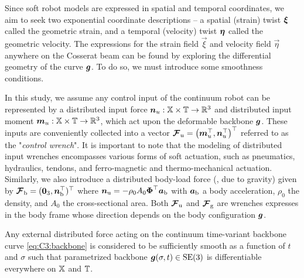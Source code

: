 Since soft robot models are expressed in spatial and temporal coordinates, we aim to seek two exponential coordinate descriptions -- a spatial (strain) twist ${\boldsymbol{\xi}}$ called the geometric strain, and a temporal (velocity) twist ${\boldsymbol{\eta}}$ called the geometric velocity. The expressions for the strain field $\vec{\xi}$ and velocity field $\vec{\eta}$ anywhere on the Cosserat beam can be found by exploring the differential geometry of the curve ${\boldsymbol{g}}$. To do so, we must introduce some smoothness conditions.

\begin{asm}
\label{assum:0}
In this study, we assume any control input of the continuum robot can be represented by a distributed input force ${\boldsymbol{n}}_u: \mathbb{X} \times \mathbb{T} \to \mathbb{R}^3$ and distributed input moment ${\boldsymbol{m}}_u: \mathbb{X} \times \mathbb{T} \to \mathbb{R}^3$, which act upon the deformable backbone ${\boldsymbol{g}}$. These inputs are conveniently collected into a vector ${\boldsymbol{\mathcal{F}}}_u = \left({\boldsymbol{m}}_u^\top, {\boldsymbol{n}}_u^\top \right)^\top$ referred to as the "\textit{control wrench}". It is important to note that the modeling of distributed input wrenches encompasses various forms of soft actuation, such as pneumatics, hydraulics, tendons, and ferro-magnetic and thermo-mechanical actuation. Similarly, we also introduce a distributed body-load force (\eg, due to gravity) given by ${\boldsymbol{\mathcal{F}}}_\textrm{b} = (\boldsymbol{0}_3, {\boldsymbol{n}}_\textrm{b}^\top)^\top$ where ${\boldsymbol{n}}_\textrm{u} = -\rho_0 A_0 {\boldsymbol{\Phi}}^\top {\boldsymbol{a}}_\textrm{b}$ with ${\boldsymbol{a}}_\textrm{b}$ a body acceleration, $\rho_0$ the density, and $A_0$ the cross-sectional area. Both ${\boldsymbol{\mathcal{F}}}_\textrm{u}$ and ${\boldsymbol{\mathcal{F}}}_\textrm{g}$ are wrenches expresses in the body frame whose direction depends on the body configuration ${\boldsymbol{g}}$. \end{asm}

\begin{asm}[On differentiability]
\label{assum:1}
Any external distributed force acting on the continuum time-variant backbone curve \eqref{eq:C3:backbone} is considered to be sufficiently smooth as a function of $t$ and $\sigma$ such that parametrized backbone $\boldsymbol{g}(\sigma,t) \in \textup{\textrm{SE}}(3)$ is differentiable everywhere on $\mathbb{X}$ and $\mathbb{T}$.
\end{asm}
%

